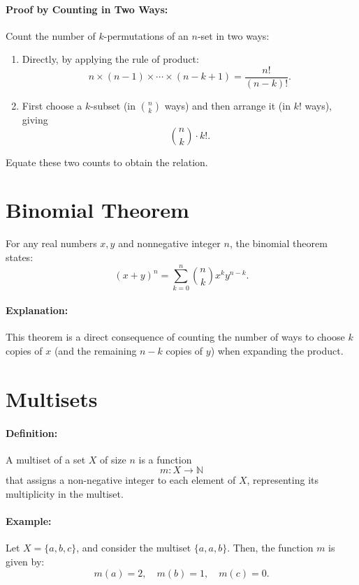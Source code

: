 \documentclass[docmute]{article}
\begin{document}
\paragraph{Proof by Counting in Two Ways:}  
Count the number of $k$-permutations of an $n$-set in two ways:
\begin{enumerate}[label=(\arabic*)]
    \item Directly, by applying the rule of product:
    \[
    n \times (n-1) \times \cdots \times (n-k+1) = \frac{n!}{(n-k)!}.
    \]
    \item First choose a $k$-subset (in $\binom{n}{k}$ ways) and then arrange it (in $k!$ ways), giving
    \[
    \binom{n}{k} \cdot k!.
    \]
\end{enumerate}
Equate these two counts to obtain the relation.

\section{Binomial Theorem}
For any real numbers $x,y$ and nonnegative integer $n$, the binomial theorem states:
\[
(x+y)^n = \sum_{k=0}^{n} \binom{n}{k} x^k y^{n-k}.
\]
\paragraph{Explanation:}  
This theorem is a direct consequence of counting the number of ways to choose $k$ copies of $x$ (and the remaining $n-k$ copies of $y$) when expanding the product.

\section{Multisets}  

\paragraph{Definition:}  
A multiset of a set \( X \) of size \( n \) is a function  
\[
m: X \to \mathbb{N}
\]
that assigns a non-negative integer to each element of \( X \), representing its multiplicity in the multiset.  

\paragraph{Example:}
Let \( X = \{a, b, c\} \), and consider the multiset \( \{a, a, b\} \). Then, the function \( m \) is given by:
\[
m(a) = 2, \quad m(b) = 1, \quad m(c) = 0.
\]
\end{document}
